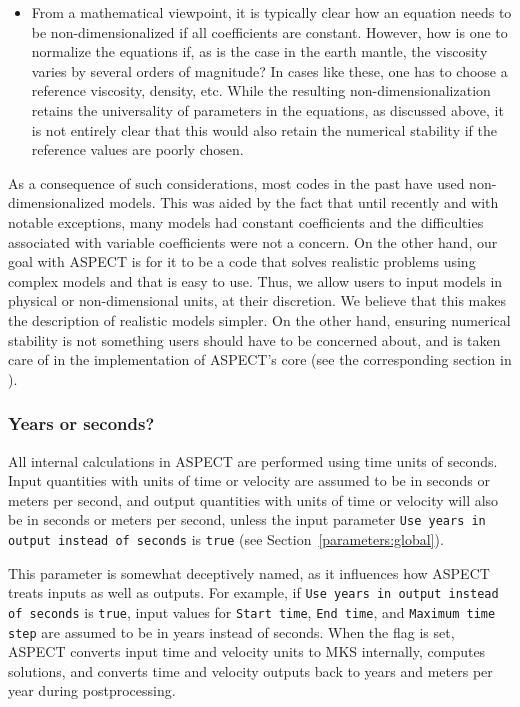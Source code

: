 \documentclass{article}
\newcommand{\aspect}{\textsc{ASPECT}}
\begin{document}
\begin{itemize}
  \item From a mathematical viewpoint, it is typically clear how an equation
  needs to be non-dimensionalized if all coefficients are constant. However, how
  is one to normalize the equations if, as is the case in the earth mantle, the
  viscosity varies by several orders of magnitude? In cases like these, one has
  to choose a reference viscosity, density, etc. While the resulting
  non-dimensionalization retains the universality of parameters in the
  equations, as discussed above, it is not entirely clear that this would also
  retain the numerical stability if the reference values are poorly chosen.
\end{itemize}

As a consequence of such considerations, most codes in the past have used
non-dimensionalized models. This was aided by the fact that until recently and
with notable exceptions, many models had constant coefficients and the
difficulties associated with variable coefficients were not a concern. On the
other hand, our goal with \aspect{} is for it to be a code that solves realistic
problems using complex models and that is easy to use. Thus, we allow users to
input models in physical or non-dimensional units, at their discretion. We
believe that this makes the description of realistic models simpler. On
the other hand, ensuring numerical stability is not something users should have
to be concerned about, and is taken care of in the implementation of \aspect{}'s
core (see the corresponding section in \cite{KHB12}).

\subsubsection{Years or seconds?}
\label{sec:years-or-seconds}

All internal calculations in \aspect{} are performed using time units of seconds.
Input quantities with units of time or velocity are assumed to be in
seconds or meters per second, and output quantities with units of time or velocity
will also be in seconds or meters per second, unless the input parameter
\texttt{Use years in output instead of seconds} is \texttt{true}
(see Section~\ref{parameters:global}).

This parameter is somewhat deceptively named, as it influences how \aspect{}
treats inputs as well as outputs. For example, if \texttt{Use years in output instead
of seconds} is \texttt{true}, input values for \texttt{Start time},
\texttt{End time}, and \texttt{Maximum time step} are assumed to be in years
instead of seconds. When the flag is set, \aspect{} converts input time and velocity
units to MKS internally, computes solutions, and converts time and velocity outputs
back to years and meters per year during postprocessing.
\end{document}
